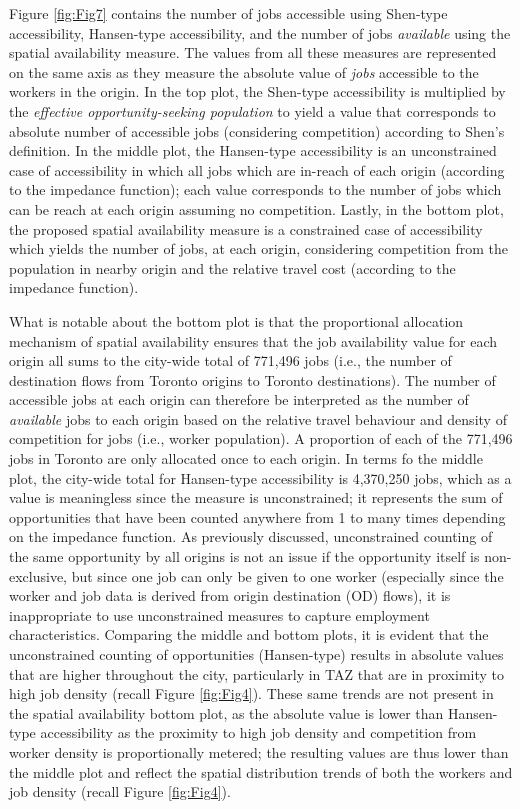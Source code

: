 \documentclass[10pt,letterpaper]{article}
\begin{document}
Figure \ref{fig:Fig7} contains the number of jobs accessible using
Shen-type accessibility, Hansen-type accessibility, and the number of
jobs \emph{available} using the spatial availability measure. The values
from all these measures are represented on the same axis as they measure
the absolute value of \emph{jobs} accessible to the workers in the
origin. In the top plot, the Shen-type accessibility is multiplied by
the \emph{effective opportunity-seeking population} to yield a value
that corresponds to absolute number of accessible jobs (considering
competition) according to Shen's definition. In the middle plot, the
Hansen-type accessibility is an unconstrained case of accessibility in
which all jobs which are in-reach of each origin (according to the
impedance function); each value corresponds to the number of jobs which
can be reach at each origin assuming no competition. Lastly, in the
bottom plot, the proposed spatial availability measure is a constrained
case of accessibility which yields the number of jobs, at each origin,
considering competition from the population in nearby origin and the
relative travel cost (according to the impedance function).

What is notable about the bottom plot is that the proportional
allocation mechanism of spatial availability ensures that the job
availability value for each origin all sums to the city-wide total of
771,496 jobs (i.e., the number of destination flows from Toronto origins
to Toronto destinations). The number of accessible jobs at each origin
can therefore be interpreted as the number of \emph{available} jobs to
each origin based on the relative travel behaviour and density of
competition for jobs (i.e., worker population). A proportion of each of
the 771,496 jobs in Toronto are only allocated once to each origin. In
terms fo the middle plot, the city-wide total for Hansen-type
accessibility is 4,370,250 jobs, which as a value is meaningless since
the measure is unconstrained; it represents the sum of opportunities
that have been counted anywhere from 1 to many times depending on the
impedance function. As previously discussed, unconstrained counting of
the same opportunity by all origins is not an issue if the opportunity
itself is non-exclusive, but since one job can only be given to one
worker (especially since the worker and job data is derived from origin
destination (OD) flows), it is inappropriate to use unconstrained
measures to capture employment characteristics. Comparing the middle and
bottom plots, it is evident that the unconstrained counting of
opportunities (Hansen-type) results in absolute values that are higher
throughout the city, particularly in TAZ that are in proximity to high
job density (recall Figure \ref{fig:Fig4}). These same trends are not
present in the spatial availability bottom plot, as the absolute value
is lower than Hansen-type accessibility as the proximity to high job
density and competition from worker density is proportionally metered;
the resulting values are thus lower than the middle plot and reflect the
spatial distribution trends of both the workers and job density (recall
Figure \ref{fig:Fig4}).
\end{document}
